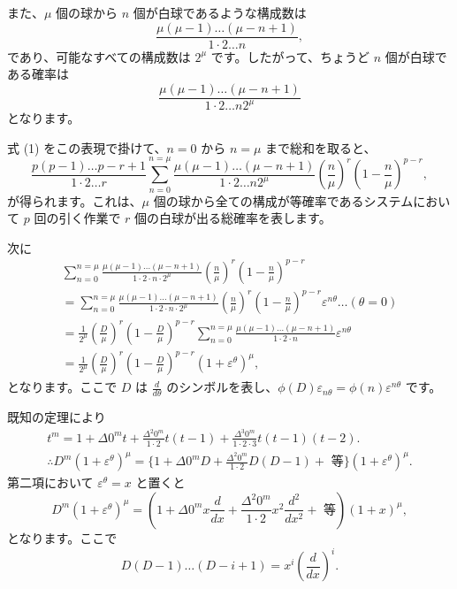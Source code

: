\documentclass[a4paper,11pt,openany]{ltjsbook}
\begin{document}
また、$\mu$ 個の球から $n$ 個が白球であるような構成数は
\[
  \frac{\mu(\mu-1) \dotsc (\mu-n+1)}{1 \cdot 2 \dotsc n},
\]
であり、可能なすべての構成数は $2^\mu$ です。したがって、ちょうど $n$ 個が白球である確率は
\[
  \frac{\mu(\mu-1) \dotsc (\mu-n+1)}{1 \cdot 2 \dotsc n 2^\mu}
\]
となります。

式 (1) をこの表現で掛けて、$n = 0$ から $n = \mu$ まで総和を取ると、
\[
  \frac{p(p-1) \dotsc p-r+1}{1 \cdot 2 \dotsc r}
  \sum_{n=0}^{n=\mu}
  \frac{\mu(\mu-1) \dotsc (\mu-n+1)}{1 \cdot 2 \dotsc n 2^\mu}
  \left( \frac{n}{\mu} \right)^r
  \left( 1-\frac{n}{\mu} \right)^{p-r} ,   \tag{2}
\]
が得られます。これは、$\mu$ 個の球から全ての構成が等確率であるシステムにおいて $p$ 回の引く作業で $r$ 個の白球が出る総確率を表します。

次に
\begin{gather*}
  \sum_{n=0}^{n=\mu}
  \frac{\mu(\mu-1) \dotsc (\mu-n+1)}
       {1 \cdot 2 \cdot n \cdot 2^\mu}
  \left( \frac{n}{\mu} \right)^r
  \left( 1-\frac{n}{\mu} \right)^{p-r}
\\
= \sum_{n=0}^{n=\mu}
  \frac{\mu(\mu-1) \dotsc (\mu-n+1)}
       {1 \cdot 2 \cdot n \cdot 2^\mu}
  \left( \frac{n}{\mu} \right)^r
  \left( 1-\frac{n}{\mu} \right)^{p-r}
  \varepsilon^{n\theta} \dotso (\theta = 0)
\\
= \frac{1}{2^\mu}
  \left( \frac{D}{\mu} \right)^r
  \left( 1-\frac{D}{\mu} \right)^{p-r}
  \sum_{n=0}^{n=\mu}
  \frac{\mu(\mu-1) \dotsc (\mu-n+1)}
       {1 \cdot 2 \cdot n}
  \varepsilon^{n\theta}
\\
= \frac{1}{2^\mu}
  \left( \frac{D}{\mu} \right)^r
  \left( 1-\frac{D}{\mu} \right)^{p-r}
  (1 + \varepsilon^\theta)^\mu,        \tag{3}
\end{gather*}
となります。ここで $D$ は $\frac{d}{d\theta}$ のシンボルを表し、$\phi(D) \varepsilon_{n\theta} = \phi(n) \varepsilon^{n\theta}$ です。

既知の定理により
\begin{gather*}
  t^m = 1 + \Delta 0^m t + \frac{\Delta^2 0^m}{1 \cdot 2} t(t-1)
      + \frac{\Delta^3 0^m}{1 \cdot 2 \cdot 3} t(t-1)(t-2).%
\\
  \therefore D^m (1+\varepsilon^\theta)^\mu
= \{1 + \Delta 0^mD + \frac{\Delta^2 0^m}{1 \cdot 2} D(D-1)
    + \text{ 等}\} (1+\varepsilon^\theta)^\mu.                   %
\end{gather*}
第二項において $\varepsilon^\theta = x$ と置くと
\[
  D^m (1+\varepsilon^\theta)^\mu
= (1 + \Delta 0^m x\frac{d}{dx}
    + \frac{\Delta^2 0^m}{1 \cdot 2} x^2 \frac{d^2}{dx^2}
    + \text{ 等}) (1+x)^\mu,                                     %
\]
となります。ここで
\[
  D(D-1) \dotsc (D-i+1) = x^i \left( \frac{d}{dx} \right)^i.
\]
\end{document}
